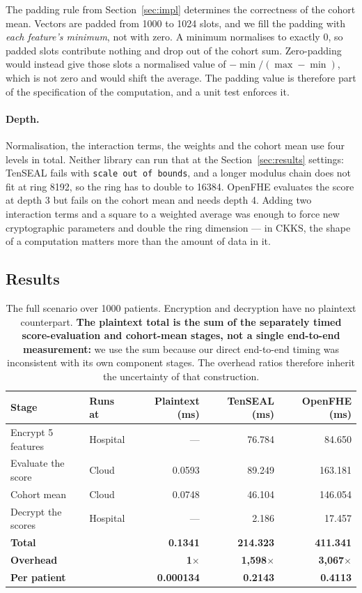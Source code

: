 \documentclass[11pt,a4paper]{article}
\begin{document}
The padding rule from Section~\ref{sec:impl} determines the correctness of the
cohort mean. Vectors are padded from 1000 to 1024 slots, and we fill the padding
with \emph{each feature's minimum}, not with zero. A minimum normalises to exactly
0, so padded slots contribute nothing and drop out of the cohort sum. Zero-padding
would instead give those slots a normalised value of $-\min/(\max-\min)$, which is
not zero and would shift the average. The padding value is therefore part of the
specification of the computation, and a unit test enforces it.

\paragraph{Depth.} Normalisation, the interaction terms, the weights and the cohort
mean use four levels in total. Neither library can run that at the
Section~\ref{sec:results} settings: TenSEAL fails with \texttt{scale out of bounds},
and a longer modulus chain does not fit at ring 8192, so the ring has to double to
16384. OpenFHE evaluates the score at depth 3 but fails on the cohort mean and needs
depth 4. Adding two interaction terms and a square to a weighted average was enough
to force new cryptographic parameters and double the ring dimension --- in CKKS, the
shape of a computation matters more than the amount of data in it.

\subsection{Results}

\begin{table}[H]\centering\small
\begin{tabular}{@{}llrrr@{}}
\toprule
\textbf{Stage} & \textbf{Runs at} & \textbf{Plaintext (ms)} &
\textbf{TenSEAL (ms)} & \textbf{OpenFHE (ms)} \\
\midrule
Encrypt 5 features & Hospital & ---     & 76.784  & 84.650  \\
Evaluate the score & Cloud    & 0.0593  & 89.249  & 163.181 \\
Cohort mean        & Cloud    & 0.0748  & 46.104  & 146.054 \\
Decrypt the scores & Hospital & ---     & 2.186   & 17.457  \\
\midrule
\textbf{Total}     &          & \textbf{0.1341} & \textbf{214.323} & \textbf{411.341} \\
\textbf{Overhead}  &          & \textbf{1$\times$} & \textbf{1{,}598$\times$} & \textbf{3{,}067$\times$} \\
\textbf{Per patient} &        & \textbf{0.000134} & \textbf{0.2143} & \textbf{0.4113} \\
\bottomrule
\end{tabular}
\caption{The full scenario over 1000 patients. Encryption and decryption have no
plaintext counterpart. \textbf{The plaintext total is the sum of the separately
timed score-evaluation and cohort-mean stages, not a single end-to-end
measurement:} we use the sum because our direct end-to-end timing was inconsistent
with its own component stages. The overhead ratios therefore inherit the
uncertainty of that construction.}
\end{table}
\end{document}
